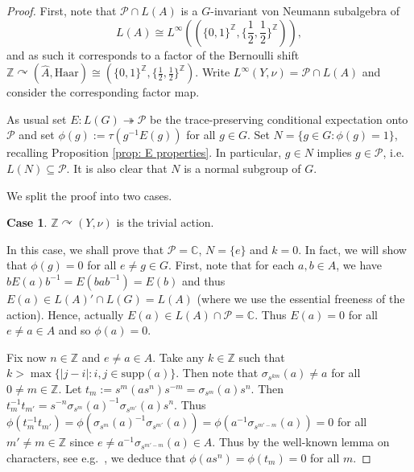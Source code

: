 \documentclass[11pt]{amsart}
\theoremstyle{plain}
\theoremstyle{definition}
\theoremstyle{remark}
\numberwithin{equation}{section}
\begin{document}
\begin{proof}
First, note that $\mathcal{P}\cap L(A)$ is a $G$-invariant von Neumann subalgebra of $$L(A)\cong L^{\infty}\left(\left(\{0,1\}^{\mathbb{Z}}, \{\frac{1}{2},\frac{1}{2}\}^{\mathbb{Z}}\right)\right),$$ and as such it corresponds to a factor of the Bernoulli shift $\mathbb{Z}\curvearrowright (\widehat{A},\text{Haar})\cong (\{0,1\}^{\mathbb{Z}}, \{\frac{1}{2},\frac{1}{2}\}^{\mathbb{Z}})$. Write $L^{\infty}(Y,\nu)=\mathcal{P}\cap L(A)$ and %
consider the corresponding factor map.

As usual set $E: L(G)\twoheadrightarrow \mathcal{P}$ be the trace-preserving conditional expectation onto $\mathcal{P}$ and set $\phi(g):=\tau(g^{-1}E(g))$ for all $g\in G$. %
Set $N=\{g\in G: \phi(g)=1\}$, recalling Proposition \ref{prop: E properties}. %
In particular, $g\in N$ implies $g\in \mathcal{P}$, i.e.\ $L(N)\subseteq \mathcal{P}$. It is also clear that $N$ is a normal subgroup of $G$.


We split the proof into two cases.

\smallskip \textbf{Case 1}. $\mathbb{Z}\curvearrowright (Y, \nu)$ is the trivial action.
\smallskip

In this case, we shall prove that $\mathcal{P}=\mathbb{C}$, $N=\{e\}$ and $k=0$. In fact, we will show that $\phi(g)=0$ for all $e\neq g\in G$. %
First, note that for each $a, b\in A$, we have $bE(a)b^{-1}=E(bab^{-1})=E(b)$ and thus $E(a)\in L(A)'\cap L(G)=L(A)$ (where we use the essential freeness of the action). Hence, actually $E(a)\in L(A)\cap \mathcal{P}=\mathbb{C}$. Thus $E(a)=0$ for all $e\neq a\in A$ and so $\phi(a)=0$. 

Fix now $n\in\mathbb{Z}$ and $e\neq a\in A$. Take any $k\in\mathbb{Z}$ such that $k>\max\{|j-i|: i,j\in\text{supp}(a)\}$. Then note that
$\sigma_{s^{km}}(a)\neq a$ for all $0\neq m\in\mathbb{Z}$. Let $t_m:=s^m(as^n)s^{-m}=\sigma_{s^m}(a)s^n$. Then $t_m^{-1}t_{m'}=s^{-n}\sigma_{s^m}(a)^{-1}\sigma_{s^{m'}}(a)s^n$. Thus $\phi(t_m^{-1}t_{m'})=\phi(\sigma_{s^m}(a)^{-1}\sigma_{s^{m'}}(a))=\phi(a^{-1}\sigma_{s^{m'-m}}(a))=0$ for all $m'\neq m\in \mathbb{Z}$ since $e\neq a^{-1}\sigma_{s^{m'-m}}(a)\in A$. Thus by the well-known lemma on characters, see e.g.\ \cite[Lemma 2.7]{dudko2024character}, we deduce that $\phi(as^n)=\phi(t_m)=0$ for all $m$. 


\end{proof}
\end{document}
